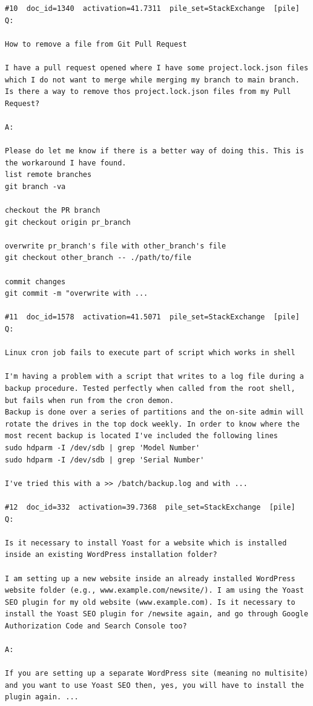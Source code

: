 \begin{verbatim}
#10  doc_id=1340  activation=41.7311  pile_set=StackExchange  [pile]
Q:

How to remove a file from Git Pull Request

I have a pull request opened where I have some project.lock.json files which I do not want to merge while merging my branch to main branch. Is there a way to remove thos project.lock.json files from my Pull Request?

A:

Please do let me know if there is a better way of doing this. This is the workaround I have found.
list remote branches
git branch -va

checkout the PR branch
git checkout origin pr_branch

overwrite pr_branch's file with other_branch's file
git checkout other_branch -- ./path/to/file

commit changes
git commit -m "overwrite with ...

#11  doc_id=1578  activation=41.5071  pile_set=StackExchange  [pile]
Q:

Linux cron job fails to execute part of script which works in shell

I'm having a problem with a script that writes to a log file during a backup procedure. Tested perfectly when called from the root shell, but fails when run from the cron demon.
Backup is done over a series of partitions and the on-site admin will rotate the drives in the top dock weekly. In order to know where the most recent backup is located I've included the following lines
sudo hdparm -I /dev/sdb | grep 'Model Number'
sudo hdparm -I /dev/sdb | grep 'Serial Number'

I've tried this with a >> /batch/backup.log and with ...

#12  doc_id=332  activation=39.7368  pile_set=StackExchange  [pile]
Q:

Is it necessary to install Yoast for a website which is installed inside an existing WordPress installation folder?

I am setting up a new website inside an already installed WordPress website folder (e.g., www.example.com/newsite/). I am using the Yoast SEO plugin for my old website (www.example.com). Is it necessary to install the Yoast SEO plugin for /newsite again, and go through Google Authorization Code and Search Console too?

A:

If you are setting up a separate WordPress site (meaning no multisite) and you want to use Yoast SEO then, yes, you will have to install the plugin again. ...


\end{verbatim}
